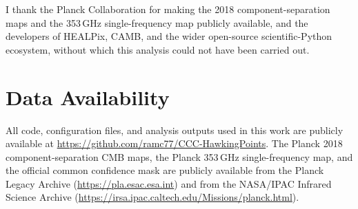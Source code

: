 \documentclass[fleqn,usenatbib]{mnras}
\begin{document}
I thank the Planck Collaboration for making the 2018 component-separation maps and the 353\,GHz single-frequency map publicly available, and the developers of HEALPix, CAMB, and the wider open-source scientific-Python ecosystem, without which this analysis could not have been carried out.

\section*{Data Availability}

All code, configuration files, and analysis outputs used in this work are publicly available at \url{https://github.com/ramc77/CCC-HawkingPoints}. The Planck 2018 component-separation CMB maps, the Planck 353\,GHz single-frequency map, and the official common confidence mask are publicly available from the Planck Legacy Archive (\url{https://pla.esac.esa.int}) and from the NASA/IPAC Infrared Science Archive (\url{https://irsa.ipac.caltech.edu/Missions/planck.html}).
\end{document}
